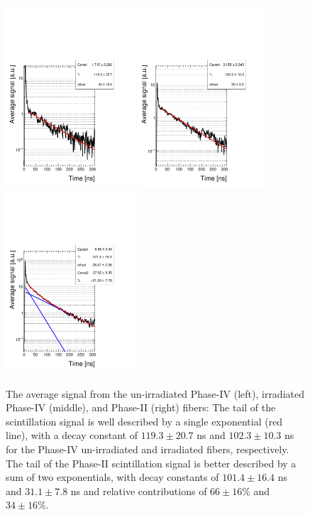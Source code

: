 \documentclass[a4paper,11pt]{article}
\begin{document}
\begin{figure}[ht]
\begin{center}
      \includegraphics[width=4.8cm]{Figures/B5_R11864_fit_zoom_singleLog.pdf}
      \includegraphics[width=4.8cm]{Figures/B4_R11863_fit_zoom_singleLog.pdf}
      \includegraphics[width=4.8cm]{Figures/B1_R11862_fit_zoom_singleLog.pdf}
\caption{\small The average signal from the un-irradiated Phase-IV (left), irradiated Phase-IV (middle), and Phase-II (right) fibers: The tail of the scintillation signal is well described by a single exponential (red line), with a decay constant of $119.3 \pm 20.7$ ns and $102.3 \pm 10.3$ ns for the Phase-IV un-irradiated and irradiated fibers, respectively. The tail of the Phase-II scintillation signal is better described by a sum of two exponentials, with decay constants of $101.4 \pm 16.4$ ns and $31.1  \pm 7.8$ ns and relative contributions of $66 \pm 16 \%$ and $34 \pm 16 \%$.}
    \label{fig:phase4scintTime}
\end{center}
\end{figure}
\end{document}
